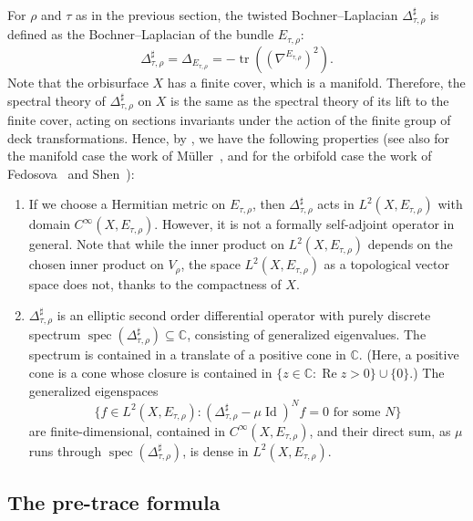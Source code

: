 \documentclass[10pt]{amsart}
\theoremstyle{plain}
\theoremstyle{definition}
\theoremstyle{remark}
\newcommand{\C}{\mathbb{C}}
\DeclareMathOperator{\RE}{Re}
\DeclareMathOperator{\tr}{tr}
\DeclareMathOperator{\Id}{Id}
\DeclareMathOperator{\spec}{spec}
\numberwithin{equation}{section}
\begin{document}
For $\rho$ and $\tau$ as in the previous section, the twisted Bochner--Laplacian $\Delta_{\tau,\rho}^\sharp$ is defined as the Bochner--Laplacian of the bundle $E_{\tau,\rho}$:
\[
\Delta_{\tau,\rho}^\sharp = \Delta_{E_{\tau,\rho}} = -\tr\left((\nabla^{E_{\tau,\rho}})^2\right).
\]
Note that the orbisurface $X$ has a finite cover, which is a manifold. Therefore, the spectral theory of $\Delta_{\tau,\rho}^\sharp$ on $X$ is the same as the spectral theory of its lift to the finite cover, acting on sections invariants under the action of the finite group of deck transformations. Hence, by \cite[Th.\,4.3]{Mk}, we have the following properties (see also for the manifold case the work of Müller~\cite{M1}, and for the orbifold case the work of Fedosova~\cite{fedell} and Shen~\cite[\S 7]{Shen2020}):
\begin{enumerate}
\item If we choose a Hermitian metric on $E_{\tau,\rho}$, then $\Delta_{\tau,\rho}^\sharp$ acts in $L^2(X,E_{\tau,\rho})$ with domain $C^\infty(X,E_{\tau,\rho})$. However, it is not a formally self-adjoint operator in general. Note that while the inner product on $L^2(X,E_{\tau,\rho})$ depends on the chosen inner product on $V_\rho$, the space $L^2(X,E_{\tau,\rho})$ as a topological vector space does not, thanks to the compactness of $X$.
\item $\Delta_{\tau,\rho}^\sharp$ is an elliptic second order differential operator with purely discrete spectrum $\spec(\Delta_{\tau,\rho}^\sharp)\subseteq\C$, consisting of generalized eigenvalues. The spectrum is contained in a translate of a positive cone in $\C$. (Here, a positive cone is a cone whose closure is contained in $\{z\in\C:\RE z>0\}\cup\{0\}$.) The generalized eigenspaces
\[
\{f\in L^2(X,E_{\tau,\rho}):(\Delta_{\tau,\rho}^\sharp-\mu\Id)^Nf=0\mbox{ for some }N\}
\]
are finite-dimensional, contained in $C^\infty(X,E_{\tau,\rho})$, and their direct sum, as $\mu$ runs through $\spec(\Delta_{\tau,\rho}^\sharp)$, is dense in $L^2(X,E_{\tau,\rho})$.
\end{enumerate}

\subsection{The pre-trace formula}
\label{subsec:pretrace}
\end{document}
